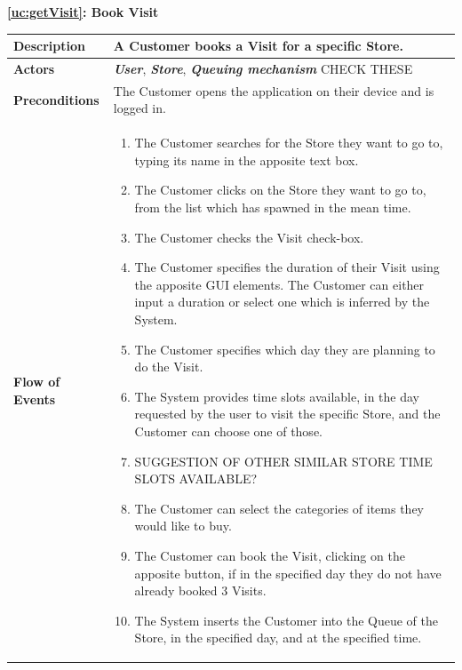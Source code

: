 \documentclass[a4paper, 10pt, oneside]{article}
\newcommand*{\lorenzo}[1]{\textcolor{BurntOrange}{#1}}
\begin{document}
\begin{center}
{\textbf{\ref{uc:getVisit}: Book Visit}}
\end{center}
\begin{tabularx}{\linewidth}{| l | X |}
	
	\hline
	\textbf{Description} & A Customer books a Visit for a specific Store.\\
	

	\hline
	\textbf{Actors} & \textbf{\textit{User}}, \textit{\textbf{Store}}, \textit{\textbf{Queuing mechanism}}  \lorenzo{CHECK THESE}\\
	
	\hline
	\textbf{Preconditions} & The Customer opens the application on their device and is logged in.\\
	
	\hline
	\textbf{Flow of Events} & \parbox{0.7\textwidth}{	
		\begin{enumerate}
			\item The Customer searches for the Store they want to go to, typing its name in the apposite text box.
			\item The Customer clicks on the Store they want to go to, from the list which has spawned in the mean time.
			\item The Customer checks the Visit check-box.
			\item The Customer specifies the duration of their Visit using the apposite GUI elements. The Customer can either input a duration or select one which is inferred by the System.
			\item The Customer specifies which day they are planning to do the Visit.
			\item The System provides time slots available, in the day requested by the user to visit the specific Store, and the Customer can choose one of those.
			\item \lorenzo{SUGGESTION OF OTHER SIMILAR STORE TIME SLOTS AVAILABLE?}
			\item The Customer can select the categories of items they would like to buy.
			\item The Customer can book the Visit, clicking on the apposite button, if in the specified day they do not have already booked 3 Visits.
			\item The System inserts the Customer into the Queue of the Store, in the specified day, and at the specified time.
	\end{enumerate}}\\
	

\end{tabularx}
\end{document}
